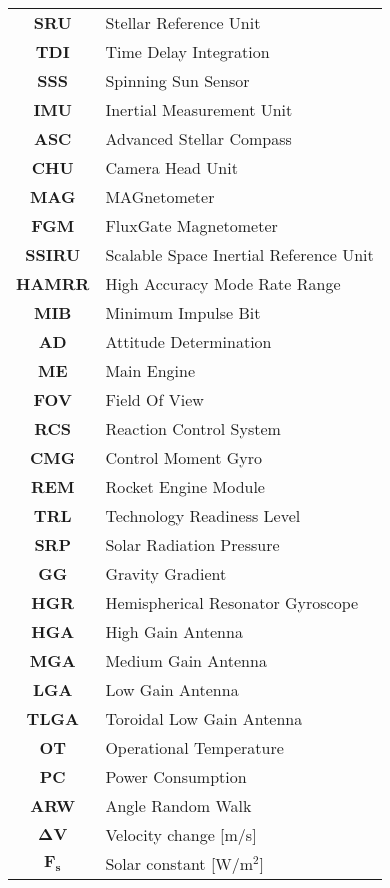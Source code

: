 \begin{multicols}{2}
{\begin{xltabular}{\linewidth}{c>{\raggedright\arraybackslash}X}
		\textbf{SRU} & Stellar Reference Unit \\
		\textbf{TDI} & Time Delay Integration \\
		\textbf{SSS} & Spinning Sun Sensor \\
		\textbf{IMU} & Inertial Measurement Unit \\
		\textbf{ASC} & Advanced Stellar Compass \\
		\textbf{CHU} & Camera Head Unit \\
		\textbf{MAG} & MAGnetometer \\
		\textbf{FGM} & FluxGate Magnetometer \\
		\textbf{SSIRU} & Scalable Space Inertial Reference Unit \\
		\textbf{HAMRR} & High Accuracy Mode Rate Range \\
		\textbf{MIB} & Minimum Impulse Bit \\
		\textbf{AD} & Attitude Determination \\
		\textbf{ME} & Main Engine \\
		\textbf{FOV} & Field Of View \\
		\textbf{RCS} & Reaction Control System \\
		\textbf{CMG} & Control Moment Gyro \\
		\textbf{REM} & Rocket Engine Module \\
		\textbf{TRL} & Technology Readiness Level \\
		\textbf{SRP} & Solar Radiation Pressure \\
		\textbf{GG} & Gravity Gradient \\
		\textbf{HGR} & Hemispherical Resonator Gyroscope \\
		\textbf{HGA} & High Gain Antenna \\
		\textbf{MGA} & Medium Gain Antenna \\
		\textbf{LGA} & Low Gain Antenna \\
		\textbf{TLGA} & Toroidal Low Gain Antenna \\
		\textbf{OT} & Operational Temperature \\
		\textbf{PC} & Power Consumption \\
		\textbf{ARW} & Angle Random Walk \\
		$\boldsymbol{\Delta V}$ & Velocity change [m/s]  \\
		$\boldsymbol{F_s}$ & Solar constant [W/$\textrm{m}^2$] 
 	\end{xltabular}
	\unskip
	\unpenalty
	\unpenalty}
	\unvbox\ltmcbox
\end{multicols}